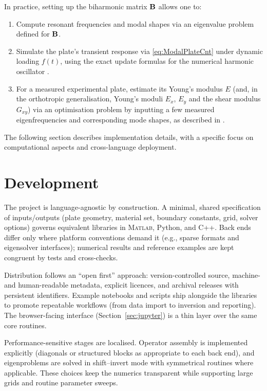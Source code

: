 In practice, setting up the biharmonic matrix $\bf B$ allows one to:
\begin{enumerate}
\item Compute resonant frequencies and modal shapes via an eigenvalue problem defined for $\bf B$.
\item Simulate the plate's transient response via \eqref{eq:ModalPlateCnt} under dynamic loading $f(t)$, using the exact update formulas for the numerical harmonic oscillator \cite{cieslinski_exact_2011}.
\item For a measured experimental plate, estimate its Young's modulus $E$ (and, in the orthotropic generalisation, Young's moduli $E_x$, $E_y$ and the shear modulus $G_{xy}$) via an optimisation problem by inputting a few measured eigenfrequencies and corresponding mode shapes, as described in \cite{ducceschi_method_2024,ducceschi_open_2024}.
\end{enumerate}
The following section describes implementation details, with a specific focus on computational aspects and cross-language deployment.


\section{Development}\label{sec:development}


The project is language-agnostic by construction. A minimal, shared specification of inputs/outputs (plate geometry, material set, boundary constants, grid, solver options) governs equivalent libraries in M\textsc{atlab}, Python, and C\textsc{++}. Back ends differ only where platform conventions demand it (e.g., sparse formats and eigensolver interfaces); numerical results and reference examples are kept congruent by tests and cross-checks.

Distribution follows an ``open first'' approach: version-controlled source, machine- and human-readable metadata, explicit licences, and archival releases with persistent identifiers. Example notebooks and scripts ship alongside the libraries to promote repeatable workflows (from data import to inversion and reporting). The browser-facing interface (Section~\ref{sec:jupyter}) is a thin layer over the same core routines.

Performance-sensitive stages are localised. Operator assembly is implemented explicitly (diagonals or structured blocks as appropriate to each back end), and eigenproblems are solved in shift–invert mode with symmetrical routines where applicable. These choices keep the numerics transparent while supporting large grids and routine parameter sweeps.

